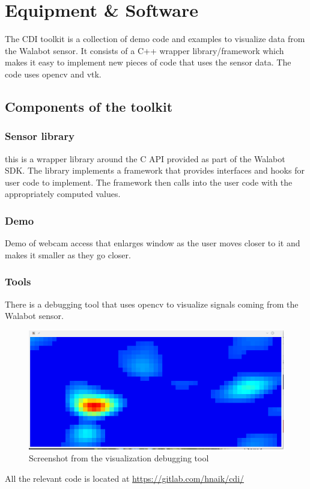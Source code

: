 \section{Equipment \& Software}

The CDI toolkit is a collection of demo code and examples to visualize
data from the Walabot sensor. It consists of a C++ wrapper
library/framework which makes it easy to implement new pieces of code
that uses the sensor data. The code uses opencv and vtk.

\subsection{Components of the toolkit}

\subsubsection{Sensor library}
this is a wrapper library around the C API provided as part of the
Walabot~\cite{walabot-spec} SDK. The library implements a framework
that provides interfaces and hooks for user code to implement. The
framework then calls into the user code with the appropriately
computed values.

\subsubsection{Demo}
Demo of webcam access that enlarges window as the user moves closer to
it and makes it smaller as they go closer.

\subsubsection{Tools}
There is a debugging tool that uses opencv to visualize signals coming
from the Walabot sensor.

\begin{figure}[H]
  \begin{center}
    \includegraphics[scale=.85]{figures/visualization_debugging}
    \caption{Screenshot from the visualization debugging tool}
    \label{fig:debug_screenshot}
  \end{center}
\end{figure}

All the relevant code is located at \url{https://gitlab.com/hnaik/cdi/}

